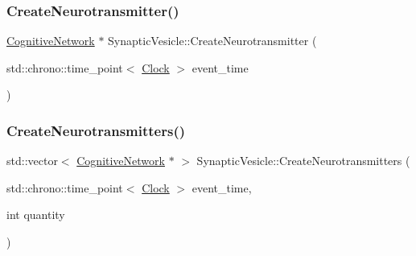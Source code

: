 \mbox{\label{classSynapticVesicle_a89f4fd3ed27a7dc768de215534325d6a}} 
\subsubsection{\texorpdfstring{Create\+Neurotransmitter()}{CreateNeurotransmitter()}}
{\footnotesize\ttfamily \mbox{\hyperlink{classCognitiveNetwork}{Cognitive\+Network}} $\ast$ Synaptic\+Vesicle\+::\+Create\+Neurotransmitter (\begin{DoxyParamCaption}\item[{std\+::chrono\+::time\+\_\+point$<$ \mbox{\hyperlink{universe_8h_a0ef8d951d1ca5ab3cfaf7ab4c7a6fd80}{Clock}} $>$}]{event\+\_\+time }\end{DoxyParamCaption})}

\mbox{\label{classSynapticVesicle_a052b85a42c2d55ca146665c40cbabffd}} 
\subsubsection{\texorpdfstring{Create\+Neurotransmitters()}{CreateNeurotransmitters()}}
{\footnotesize\ttfamily std\+::vector$<$ \mbox{\hyperlink{classCognitiveNetwork}{Cognitive\+Network}} $\ast$ $>$ Synaptic\+Vesicle\+::\+Create\+Neurotransmitters (\begin{DoxyParamCaption}\item[{std\+::chrono\+::time\+\_\+point$<$ \mbox{\hyperlink{universe_8h_a0ef8d951d1ca5ab3cfaf7ab4c7a6fd80}{Clock}} $>$}]{event\+\_\+time,  }\item[{int}]{quantity }\end{DoxyParamCaption})}

\mbox{\label{classSynapticVesicle_a5ab4ecfb4a880bc729078f5529c547bc}} 
